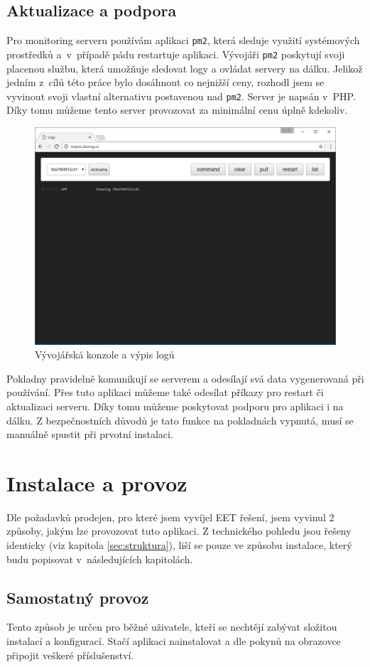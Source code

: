 \documentclass[a4paper,11pt,oneside]{article}
\begin{document}
\subsection{Aktualizace a podpora}

Pro monitoring serveru používám aplikaci \lstinline|pm2|, která sleduje využití systémových prostředků a~v~případě pádu restartuje aplikaci. Vývojáři \lstinline|pm2| poskytují svoji placenou službu, která umožňuje sledovat logy a ovládat servery na dálku. Jelikož jedním z~cílů této práce bylo dosáhnout co nejnižší ceny, rozhodl jsem se vyvinout svoji vlastní alternativu postavenou nad \lstinline|pm2|. Server je napsán v~PHP. Díky tomu můžeme tento server provozovat za minimální cenu úplně kdekoliv.

\begin{figure}[H]
	\centering
	\includegraphics[width=0.5\linewidth]{../logs}
	\caption{Vývojářská konzole a výpis logů}
	\label{fig:logs}
\end{figure}

Pokladny pravidelně komunikují se serverem a odesílají svá data vygenerovaná při používání. Přes tuto aplikaci můžeme také odesílat příkazy pro restart či aktualizaci serveru. Díky tomu můžeme poskytovat podporu pro aplikaci i na dálku. Z bezpečnostních důvodů je tato funkce na pokladnách vypnutá, musí se manuálně spustit při prvotní instalaci.  

\pagebreak
\section{Instalace a provoz}
Dle požadavků prodejen, pro které jsem vyvíjel EET řešení, jsem vyvinul 2 způsoby, jakým lze provozovat tuto aplikaci. Z technického pohledu jsou řešeny identicky (viz kapitola \ref{sec:struktura}), liší se pouze ve způsobu instalace, který budu popisovat v~následujících kapitolách.

\subsection{Samostatný provoz}
\label{sec:samostatny}
Tento způsob je určen pro běžné uživatele, kteří se nechtějí zabývat složitou instalací a konfigurací. Stačí aplikaci nainstalovat a dle pokynů na obrazovce připojit veškeré příslušenství.
\end{document}
